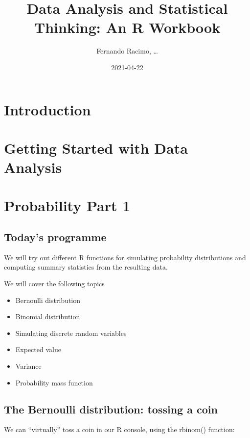 \documentclass[
]{book}
\title{Data Analysis and Statistical Thinking: An R Workbook}
\author{Fernando Racimo, \ldots{}}
\date{2021-04-22}
\providecommand{\tightlist}{%
  \setlength{\itemsep}{0pt}\setlength{\parskip}{0pt}}
\begin{document}
\maketitle

{
\setcounter{tocdepth}{1}
\tableofcontents
}
\hypertarget{introduction}{%
\chapter{Introduction}\label{introduction}}

\hypertarget{intro}{%
\chapter{Getting Started with Data Analysis}\label{intro}}

\hypertarget{prob1}{%
\chapter{Probability Part 1}\label{prob1}}

\hypertarget{todays-programme}{%
\section{Today's programme}\label{todays-programme}}

We will try out different R functions for simulating probability distributions and computing summary statistics from the resulting data.

We will cover the following topics

\begin{itemize}
\tightlist
\item
  Bernoulli distribution
\item
  Binomial distribution
\item
  Simulating discrete random variables
\item
  Expected value
\item
  Variance
\item
  Probability mass function
\end{itemize}

\hypertarget{the-bernoulli-distribution-tossing-a-coin}{%
\section{The Bernoulli distribution: tossing a coin}\label{the-bernoulli-distribution-tossing-a-coin}}

We can ``virtually'' toss a coin in our R console, using the rbinom() function:
\end{document}
